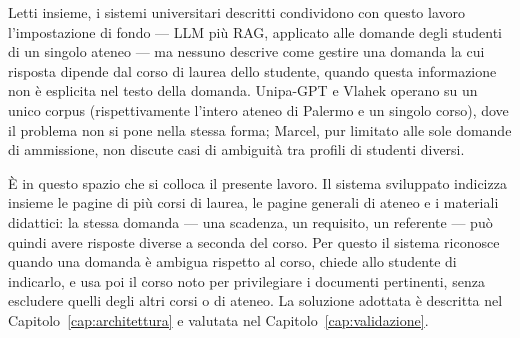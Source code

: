Letti insieme, i sistemi universitari descritti condividono con questo lavoro l'impostazione di fondo --- LLM più
RAG, applicato alle domande degli studenti di un singolo ateneo --- ma nessuno descrive come gestire una domanda la
cui risposta dipende dal corso di laurea dello studente, quando questa informazione non è esplicita nel testo della
domanda. Unipa-GPT e Vlahek operano su un unico corpus (rispettivamente l'intero ateneo di Palermo e un singolo
corso), dove il problema non si pone nella stessa forma; Marcel, pur limitato alle sole domande di ammissione, non
discute casi di ambiguità tra profili di studenti diversi.

È in questo spazio che si colloca il presente lavoro. Il sistema sviluppato indicizza insieme le pagine di più corsi
di laurea, le pagine generali di ateneo e i materiali didattici: la stessa domanda --- una scadenza, un requisito,
un referente --- può quindi avere risposte diverse a seconda del corso. Per questo il sistema riconosce quando una
domanda è ambigua rispetto al corso, chiede allo studente di indicarlo, e usa poi il corso noto per privilegiare i
documenti pertinenti, senza escludere quelli degli altri corsi o di ateneo. La soluzione adottata è descritta nel
Capitolo~\ref{cap:architettura} e valutata nel Capitolo~\ref{cap:validazione}.
